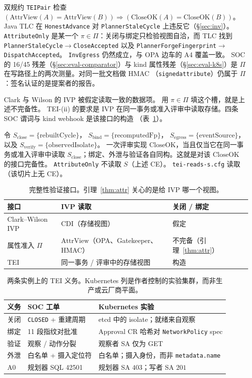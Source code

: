 \documentclass[acmsmall,manuscript,review,anonymous]{acmart}
\renewcommand{\_}{\discretionary{\textunderscore}{}{\textunderscore}}
\begin{document}
双规约 \texttt{TEIPair} 检查
$(\mathrm{AttrView}(A)=\mathrm{AttrView}(B))\Rightarrow(\mathrm{CloseOK}(A)=\mathrm{CloseOK}(B))$。
Java {TLC} 在 \texttt{HonestAdvance} 对
\texttt{PlannerStaleCycle} 上违反它（\S\ref{sec:inv}）。
\texttt{AttributeOnly} 是某一个 $\pi\in\Pi$：关闭与绑定只检验视图自洽，而 {TLC} 找到
\texttt{PlannerStaleCycle}$\to$\texttt{CloseAccepted} 以及
\texttt{PlannerForgeFingerprint}$\to$\texttt{DispatchAccepted}。
\texttt{InvEgress} 仍然成立，与 {OPA} 边车的 A4 覆盖一致。
{SOC} 的 16/45 残差（\S\ref{sec:eval-comparator}）与 kind 属性残差（\S\ref{sec:eval-k8s}）是 $\Pi$ 在写路径上的两次测量。对同一批文档做 {HMAC}
（\texttt{signed\_attribute}）仍属于 $\Pi$：签名认证的是提案者的报告。

Clark 与 Wilson 的 {IVP} 被假定读取一致的数据项。
用 $\pi\in\Pi$ 填这个槽，就是上述不完备性。
TEI-(ii) 的要求是 {IVP} 在同一事务或准入评审中读取存储。四条 {SOC} 谓词与 kind webhook 是该接口的构造
（表~\ref{tab:cw-ivp}）。

令 $S_{\mathrm{close}}=\{\mathrm{rebuiltCycle}\}$，
$S_{\mathrm{bind}}=\{\mathrm{recomputedFp}\}$，
$S_{\mathrm{egress}}=\{\mathrm{eventSource}\}$，以及
$S_{\mathrm{verify}}=\{\mathrm{observedIsolate}\}$。
一次评审实现 $\mathrm{CloseOK}$，当且仅当它在同一事务或准入评审中读取 $S_{\mathrm{close}}$；绑定、外泄与验证各自同构。这就是对该 $\mathrm{CloseOK}$ 的接口完备性。
\texttt{AttributeOnly} 不读取 $S$（上述 {CE}）。
\texttt{tei-reads-s.cfg} 读取（该切片上无 {CE}）。

\begin{table}[t]
\centering
\small
\caption{完整性验证接口。引理~\ref{thm:attr} 关心的是给 {IVP} 哪一个视图。}
\label{tab:cw-ivp}
\begin{tabular}{@{}lll@{}}
\hline
接口 & {IVP} 读取 & 关闭 / 绑定 \\
\hline
Clark--Wilson {IVP} & {CDI}（存储视图） & 假定 \\
属性准入 $\Pi$ & $\mathrm{AttrView}$（{OPA}、Gatekeeper、{HMAC}） & 不完备（引理~\ref{thm:attr}） \\
{TEI} & 同一事务 / 评审中的存储视图 & 构造 \\
\hline
\end{tabular}
\end{table}

\begin{table}[t]
\centering
\small
\caption{两条实例上的 TEI 义务。Kubernetes 列是作者控制的实验集群，而非生产或云厂商平面。}
\label{tab:tei-map}
\begin{tabular}{@{}lll@{}}
\hline
义务 & SOC 工单 & Kubernetes 实验 \\
\hline
关闭 & \texttt{CLOSED} + 重建周期 & etcd 中的 isolate；就绪来自观察 \\
绑定 & 11 段指纹对批准 & Approval CR 哈希对 \texttt{NetworkPolicy} spec \\
验证 & 观察 / 动作分裂 & 观察者 SA 仅为 GET \\
外泄 & 白名单 + 摄入定位符 & 白名单；摄入身份，而非 \texttt{metadata.name} \\
A0 & 规划器 {SQL} 42501 & 规划器 SA $403$；写者 SA $201$ \\
\hline
\end{tabular}
\end{table}
\end{document}
